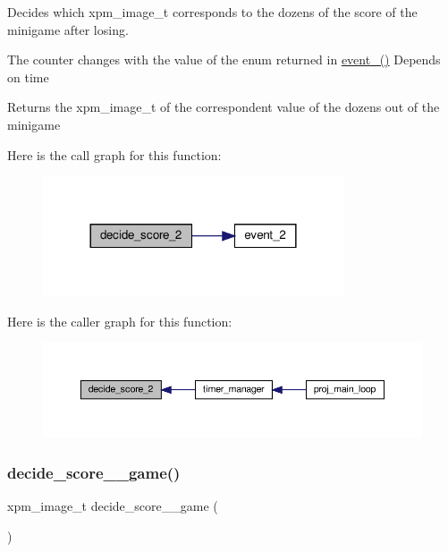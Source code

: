 Decides which xpm\+\_\+image\+\_\+t corresponds to the dozens of the score of the minigame after losing. 

The counter changes with the value of the enum returned in \hyperlink{group__loading__xpms_gac00aab23f7677ce5eee5748c335c994f}{event\+\_()} Depends on time

\begin{DoxyReturn}{Returns}
the xpm\+\_\+image\+\_\+t of the correspondent value of the dozens out of the minigame 
\end{DoxyReturn}
Here is the call graph for this function\+:
\nopagebreak
\begin{figure}[H]
\begin{center}
\leavevmode
\includegraphics[width=252pt]{group__loading__xpms_ga3ff28b6df0ced24968db40bec439452e_cgraph}
\end{center}
\end{figure}
Here is the caller graph for this function\+:
\nopagebreak
\begin{figure}[H]
\begin{center}
\leavevmode
\includegraphics[width=350pt]{group__loading__xpms_ga3ff28b6df0ced24968db40bec439452e_icgraph}
\end{center}
\end{figure}
\mbox{\label{group__loading__xpms_ga2427af4195752a8d1c1f52ec6ade7735}} 
\subsubsection{\texorpdfstring{decide\+\_\+score\+\_\+\_\+game()}{decide\_score\_2\_game()}}
{\footnotesize\ttfamily xpm\+\_\+image\+\_\+t decide\+\_\+score\+\_\+\_\+game (\begin{DoxyParamCaption}{ }\end{DoxyParamCaption})}



